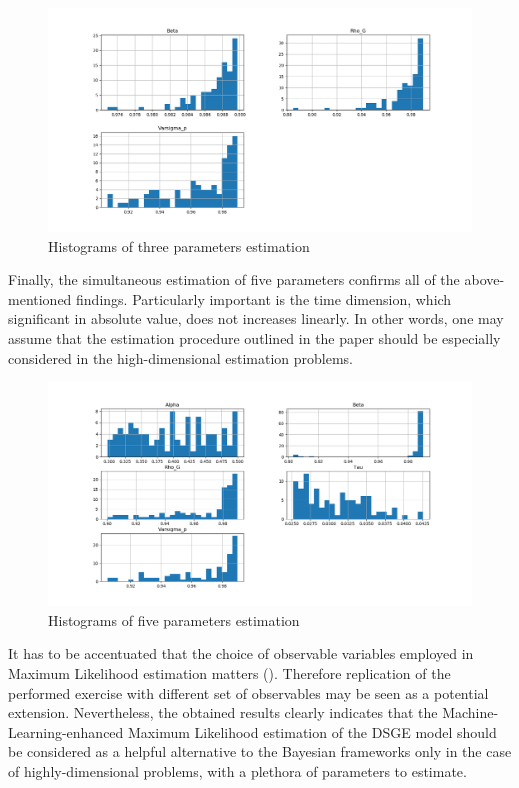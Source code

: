 \documentclass{pracamgr}
\numberwithin{equation}{section}
\begin{document}
\begin{figure}[!htbp] \centering
\includegraphics[width=\textwidth]{Hist_3}
\caption[Histograms of three parameters estimation]{Histograms of three parameters estimation}
\label{Hist_3}
\end{figure} 

\newpage

Finally, the simultaneous estimation of five parameters confirms all of the above-mentioned findings. Particularly important is the time dimension, which significant in absolute value, does not increases linearly. In other words, one may assume that the estimation procedure outlined in the paper should be especially considered in the high-dimensional estimation problems.

\begin{figure}[H] \centering
\includegraphics[width=\textwidth]{Hist_all}
\caption[Histograms of five parameters estimation]{Histograms of five parameters estimation}
\label{Hist_all}
\end{figure} 

It has to be accentuated that the choice of observable variables employed in Maximum Likelihood estimation matters (\citet{ruge2007methods}). Therefore replication of the performed exercise with different set of observables may be seen as a potential extension. Nevertheless, the obtained results clearly indicates that the Machine-Learning-enhanced Maximum Likelihood estimation of the DSGE model should be considered as a helpful alternative to the Bayesian frameworks only in the case of highly-dimensional problems, with a plethora of parameters to estimate.
\end{document}
